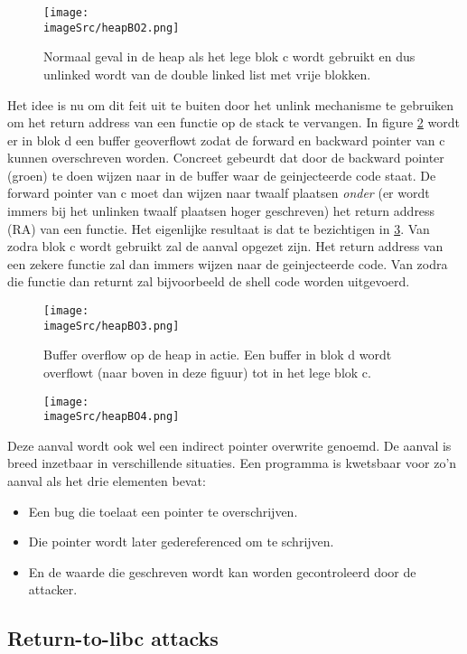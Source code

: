 \documentclass[../main.tex]{subfiles}
\begin{document}
\begin{figure}
\centering
\texttt{[image: \\imageSrc/heapBO2.png]}
\caption{Normaal geval in de heap als het lege blok c wordt gebruikt en dus unlinked wordt van de double linked list met vrije blokken.}
\label{f:heapBO2}
\end{figure}

Het idee is nu om dit feit uit te buiten door het unlink mechanisme te gebruiken om het return address van een functie op de stack te vervangen.
In figure \ref{f:heapBO3} wordt er in blok d een buffer geoverflowt zodat de forward en backward pointer van c kunnen overschreven worden.
Concreet gebeurdt dat door de backward pointer (groen) te doen wijzen naar in de buffer waar de geinjecteerde code staat. 
De forward pointer van c moet dan wijzen naar twaalf plaatsen \emph{onder} (er wordt immers bij het unlinken twaalf plaatsen hoger geschreven) het return address (RA) van een functie.
Het eigenlijke resultaat is dat te bezichtigen in \ref{f:heapBO4}.
Van zodra blok c wordt gebruikt zal de aanval opgezet zijn.
Het return address van een zekere functie zal dan immers wijzen naar de geinjecteerde code. 
Van zodra die functie dan returnt zal bijvoorbeeld de shell code worden uitgevoerd.

\begin{figure}
\centering
\texttt{[image: \\imageSrc/heapBO3.png]}
\caption{Buffer overflow op de heap in actie. Een buffer in blok d wordt overflowt (naar boven in deze figuur) tot in het lege blok c.}
\label{f:heapBO3}
\end{figure}

\begin{figure}
\centering
\texttt{[image: \\imageSrc/heapBO4.png]}
\caption{}
\label{f:heapBO4}
\end{figure}

Deze aanval wordt ook wel een indirect pointer overwrite genoemd.
De aanval is breed inzetbaar in verschillende situaties.
Een programma is kwetsbaar voor zo'n aanval als het drie elementen bevat:
\begin{itemize}
		\item Een bug die toelaat een pointer te overschrijven.
		\item Die pointer wordt later gedereferenced om te schrijven.
		\item En de waarde die geschreven wordt kan worden gecontroleerd door de attacker.
\end{itemize}


\subsection{Return-to-libc attacks}
\end{document}
